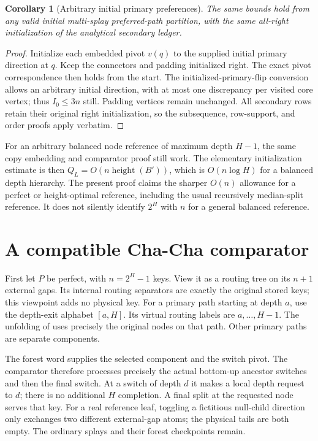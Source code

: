 \documentclass[11pt]{article}
\numberwithin{equation}{section}
\newtheorem{corollary}[theorem]{Corollary}
\begin{document}
\begin{corollary}[Arbitrary initial primary preferences]
The same bounds hold from any valid initial multi-splay preferred-path
partition, with the same all-right initialization of the analytical
secondary ledger.
\end{corollary}
\begin{proof}
Initialize each embedded pivot $v(q)$ to the supplied initial primary
direction at $q$. Keep the connectors and padding initialized right.
The exact pivot correspondence then holds from the start. The
initialized-primary-flip conversion allows an arbitrary initial
direction, with at most one discrepancy per visited core vertex;
thus $I_0\le3n$ still. Padding vertices remain unchanged. All secondary
rows retain their original right initialization, so the subsequence,
row-support, and order proofs apply verbatim.
\end{proof}

For an arbitrary balanced node reference of maximum depth $H-1$, the
same copy embedding and comparator proof still work. The elementary
initialization estimate is then $Q_L=O(n\operatorname{height}(B'))$,
which is $O(n\log H)$ for a balanced depth hierarchy. The present proof
claims the sharper $O(n)$ allowance for a perfect or height-optimal
reference, including the usual recursively median-split reference.
It does not
silently identify $2^H$ with $n$ for a general balanced reference.


\section{A compatible Cha-Cha comparator}\label{sec:comparator}

First let $P$ be perfect, with $n=2^H-1$ keys. View it as a routing
tree on its $n+1$ external gaps. Its internal routing separators are
exactly the original stored keys; this viewpoint adds no physical key.
For a primary path starting at depth $a$, use the depth-exit alphabet
$[a,H]$. Its virtual routing labels are $a,\ldots,H-1$. The unfolding
of \cite{ChaCha} uses precisely the original nodes on that path.
Other primary paths are separate components.

The forest word supplies the selected component and the switch pivot.
The comparator therefore processes precisely the actual bottom-up
ancestor switches and then the final switch. At a switch of depth
$d$ it makes a local depth request to $d$; there is no additional
$H$ completion. A final split at the requested node serves that key.
For a real reference leaf, toggling a fictitious null-child direction
only exchanges two different external-gap atoms; the physical tails
are both empty. The ordinary splays and their forest checkpoints remain.
\end{document}
